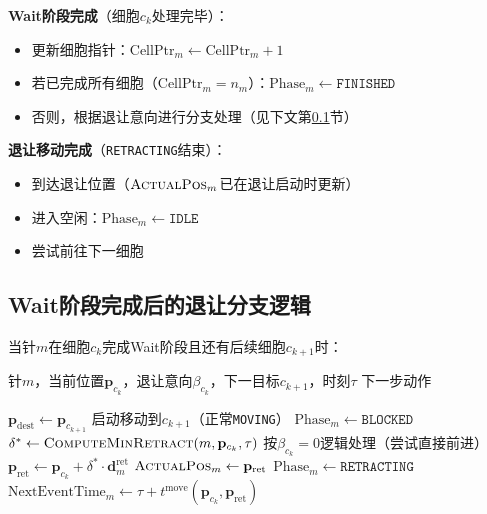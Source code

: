 \documentclass[11pt,a4paper]{article}
\begin{document}
\textbf{Wait阶段完成}（细胞$c_k$处理完毕）：
\begin{itemize}
    \item 更新细胞指针：$\text{CellPtr}_m \leftarrow \text{CellPtr}_m + 1$
    \item 若已完成所有细胞（$\text{CellPtr}_m = n_m$）：$\text{Phase}_m \leftarrow \texttt{FINISHED}$
    \item 否则，根据退让意向进行分支处理（见下文第\ref{sec:wait_complete}节）
\end{itemize}

\textbf{退让移动完成}（\texttt{RETRACTING}结束）：
\begin{itemize}
    \item 到达退让位置（$\textsc{ActualPos}_m$已在退让启动时更新）
    \item 进入空闲：$\text{Phase}_m \leftarrow \texttt{IDLE}$
    \item 尝试前往下一细胞
\end{itemize}

\subsection{Wait阶段完成后的退让分支逻辑} \label{sec:wait_complete}

当针$m$在细胞$c_k$完成Wait阶段且还有后续细胞$c_{k+1}$时：

\begin{algorithm}[H]
\caption{Wait完成后的退让决策逻辑 (PostWaitDispatch)}
\begin{algorithmic}[1]
\Require 针$m$，当前位置$\mathbf{p}_{c_k}$，退让意向$\beta_{c_k}$，下一目标$c_{k+1}$，时刻$\tau$
\Ensure 下一步动作

 
    \State $\mathbf{p}_{\text{dest}} \leftarrow \mathbf{p}_{c_{k+1}}$
        \State 启动移动到$c_{k+1}$（正常\texttt{MOVING}）
    \Else
        \State $\text{Phase}_m \leftarrow \texttt{BLOCKED}$
    \EndIf
{} 
    \State $\delta^* \leftarrow \textsc{ComputeMinRetract}(m, \mathbf{p}_{c_k}, \tau)$ 
      
        \State 按$\beta_{c_k} = 0$逻辑处理（尝试直接前进）
    \Else
        \State $\mathbf{p}_{\text{ret}} \leftarrow \mathbf{p}_{c_k} + \delta^* \cdot \mathbf{d}_m^{\text{ret}}$
        \State $\textsc{ActualPos}_m \leftarrow \mathbf{p}_{\text{ret}}$ 
        \State $\text{Phase}_m \leftarrow \texttt{RETRACTING}$
        \State $\text{NextEventTime}_m \leftarrow \tau + t^{\text{move}}(\mathbf{p}_{c_k}, \mathbf{p}_{\text{ret}})$
    \EndIf
\EndIf
\end{algorithmic}
\end{algorithm}
\end{document}
